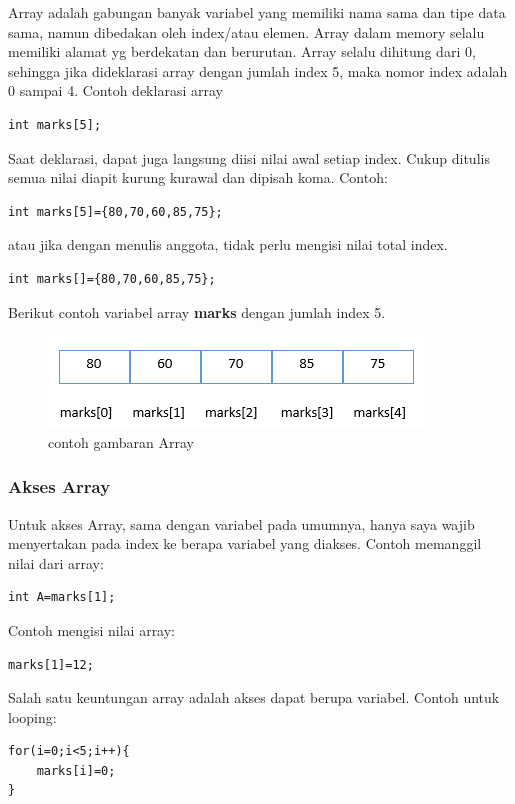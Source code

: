 \documentclass[12pt,]{article}
\begin{document}
	Array adalah gabungan banyak variabel yang memiliki nama sama dan tipe data sama, namun dibedakan oleh index/atau elemen.
	Array dalam memory selalu memiliki alamat yg berdekatan dan berurutan.
	Array selalu dihitung dari 0, sehingga jika dideklarasi array dengan jumlah index 5, maka nomor index adalah 0 sampai 4.
	Contoh deklarasi array
\begin{verbatim}
int marks[5];
\end{verbatim}
	Saat deklarasi, dapat juga langsung diisi nilai awal setiap index.
	Cukup ditulis semua nilai diapit kurung kurawal dan dipisah koma.
	Contoh:
\begin{verbatim}
int marks[5]={80,70,60,85,75};
\end{verbatim}
	atau jika dengan menulis anggota, tidak perlu mengisi nilai total index.
	\begin{verbatim}
int marks[]={80,70,60,85,75};
	\end{verbatim}

	Berikut contoh variabel array \textbf{marks} dengan jumlah index 5.

	\begin{figure}[H]
		\centering
		\includegraphics[width=0.35\linewidth]{images/array}
		\caption{contoh gambaran Array}
	\end{figure}

	\subsubsection{Akses Array}

	Untuk akses Array, sama dengan variabel pada umumnya, hanya saya wajib menyertakan pada index ke berapa variabel yang diakses.
	Contoh memanggil nilai dari array:
	\begin{verbatim}
int A=marks[1];
	\end{verbatim}

	Contoh mengisi nilai array:
	\begin{verbatim}
marks[1]=12;
	\end{verbatim}

	Salah satu keuntungan array adalah akses dapat berupa variabel.
	Contoh untuk looping:
	\begin{verbatim}
for(i=0;i<5;i++){
	marks[i]=0;
}
	\end{verbatim}
\end{document}
